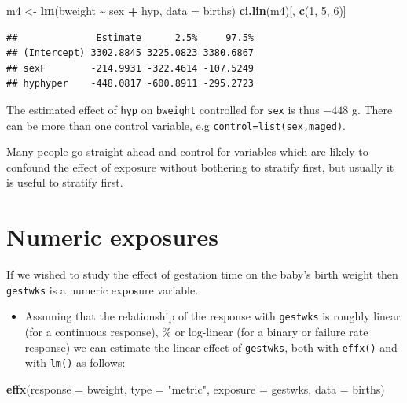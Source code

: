 \documentclass[
]{book}
\newenvironment{Shaded}{\begin{snugshade}}{\end{snugshade}}
\newcommand{\AttributeTok}[1]{\textcolor[rgb]{0.13,0.29,0.53}{#1}}
\newcommand{\DecValTok}[1]{\textcolor[rgb]{0.00,0.00,0.81}{#1}}
\newcommand{\FunctionTok}[1]{\textcolor[rgb]{0.13,0.29,0.53}{\textbf{#1}}}
\newcommand{\NormalTok}[1]{#1}
\newcommand{\OtherTok}[1]{\textcolor[rgb]{0.56,0.35,0.01}{#1}}
\newcommand{\SpecialCharTok}[1]{\textcolor[rgb]{0.81,0.36,0.00}{\textbf{#1}}}
\newcommand{\StringTok}[1]{\textcolor[rgb]{0.31,0.60,0.02}{#1}}
\providecommand{\tightlist}{%
  \setlength{\itemsep}{0pt}\setlength{\parskip}{0pt}}
\begin{document}
\begin{Shaded}
\begin{Highlighting}[]
\NormalTok{m4 }\OtherTok{\textless{}{-}} \FunctionTok{lm}\NormalTok{(bweight }\SpecialCharTok{\textasciitilde{}}\NormalTok{ sex }\SpecialCharTok{+}\NormalTok{ hyp, }\AttributeTok{data =}\NormalTok{ births)}
\FunctionTok{ci.lin}\NormalTok{(m4)[, }\FunctionTok{c}\NormalTok{(}\DecValTok{1}\NormalTok{, }\DecValTok{5}\NormalTok{, }\DecValTok{6}\NormalTok{)]}
\end{Highlighting}
\end{Shaded}

\begin{verbatim}
##              Estimate      2.5%     97.5%
## (Intercept) 3302.8845 3225.0823 3380.6867
## sexF        -214.9931 -322.4614 -107.5249
## hyphyper    -448.0817 -600.8911 -295.2723
\end{verbatim}

The estimated effect of \texttt{hyp} on \texttt{bweight}
controlled for \texttt{sex} is thus \(-448\) g.
There can be more than one control variable, e.g
\texttt{control=list(sex,maged)}.

Many people go straight ahead and control for variables which are likely to confound the effect of exposure without bothering to stratify first, but usually it is useful to stratify first.

\section{Numeric exposures}\label{numeric-exposures}

If we wished to study the effect of gestation time on the baby's birth
weight then \texttt{gestwks} is a numeric exposure variable.

\begin{itemize}
\tightlist
\item
  Assuming that the relationship
  of the response with \texttt{gestwks} is roughly linear
  (for a continuous response),
  \% or log-linear (for a binary or failure rate response)
  we can estimate the linear effect of \texttt{gestwks},
  both with \texttt{effx()} and with \texttt{lm()} as follows:
\end{itemize}

\begin{Shaded}
\begin{Highlighting}[]
\FunctionTok{effx}\NormalTok{(}\AttributeTok{response =}\NormalTok{ bweight, }\AttributeTok{type =} \StringTok{"metric"}\NormalTok{, }\AttributeTok{exposure =}\NormalTok{ gestwks, }\AttributeTok{data =}\NormalTok{ births)}
\end{Highlighting}
\end{Shaded}
\end{document}
